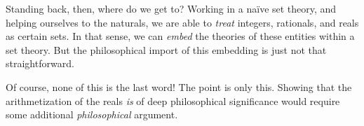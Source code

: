 \documentclass[10pt,a4paper]{article}
\theoremstyle{plain}
\theoremstyle{definition}
\theoremstyle{remark}
\begin{document}
Standing back, then, where do we get to? Working in a na\"ive set
theory, and helping ourselves to the naturals, we are able to
\emph{treat} integers, rationals, and reals as certain sets. In that
sense, we can \emph{embed} the theories of these entities within a set
theory. But the philosophical import of this embedding is just not
that straightforward. 

Of course, none of this is the last word!{} The point is only this.
Showing that the arithmetization of the reals \emph{is} of deep
philosophical significance would require some additional
\emph{philosophical} argument.

\end{document}
